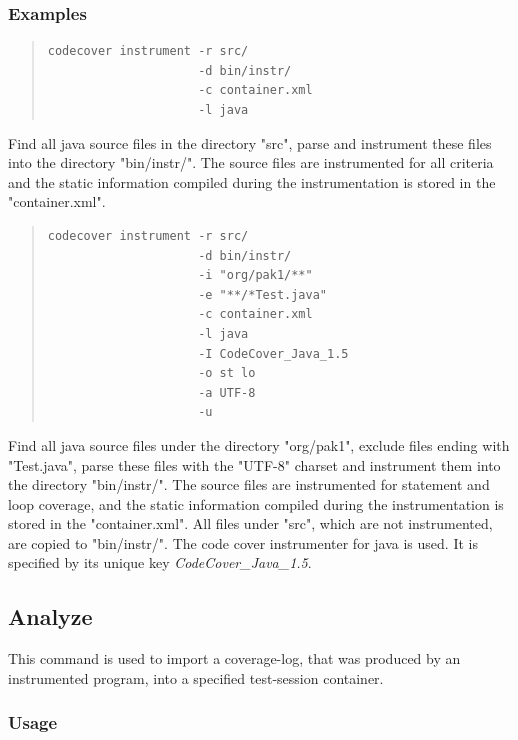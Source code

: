 \subsubsection{Examples}\label{command:in:examples}
\begin{quote}
\begin{verbatim}
codecover instrument -r src/ 
                     -d bin/instr/ 
                     -c container.xml 
                     -l java
\end{verbatim}
\end{quote}
Find all java source files in the directory "src", parse and instrument these files into the directory "bin/instr/". The source files are instrumented for all criteria and the static information compiled during the instrumentation is stored in the "container.xml".  
\begin{quote}
\begin{verbatim}
codecover instrument -r src/ 
                     -d bin/instr/ 
                     -i "org/pak1/**"
                     -e "**/*Test.java"
                     -c container.xml 
                     -l java
                     -I CodeCover_Java_1.5
                     -o st lo
                     -a UTF-8
                     -u
\end{verbatim}
\end{quote}
Find all java source files under the directory "org/pak1", exclude files ending with "Test.java", parse these files with the "UTF-8" charset and instrument them into the directory "bin/instr/". The source files are instrumented for statement and loop coverage, and the static information compiled during the instrumentation is stored in the "container.xml". All files under "src", which are not instrumented, are copied to "bin/instr/". The code cover instrumenter for java is used. It is specified by its unique key \textit{CodeCover\_Java\_1.5}.


\subsection{Analyze}\label{Command-Analyze}
This command is used to import a coverage-log, that was produced by an instrumented program, into a specified test-session container.
\subsubsection{Usage}\label{command:an:usage}
\begin{quote}
\end{quote}

